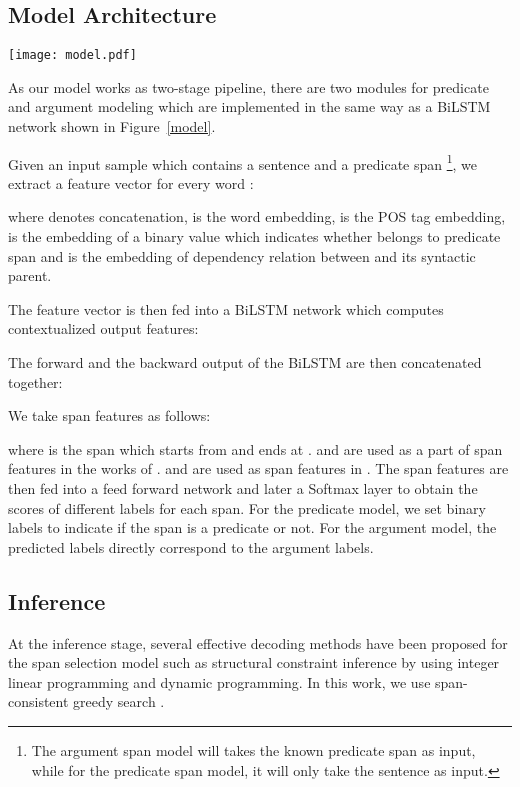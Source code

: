 \documentclass[letterpaper]{article} \usepackage{aaai20}  \usepackage{times}  \usepackage{helvet} \usepackage{courier}  \usepackage[hyphens]{url}  \urlstyle{rm} \def\UrlFont{\rm}  \usepackage{graphicx}  \frenchspacing  \setlength{\pdfpagewidth}{8.5in}  \setlength{\pdfpageheight}{11in}
\begin{document}
\subsection{Model Architecture}

\begin{figure*}[ht]
\begin{center}
\texttt{[image: model.pdf]}
\caption{An overview of the span model}
\label{model}
\end{center}
\end{figure*}

As our model works as two-stage pipeline, there are two modules for predicate and argument modeling which are implemented in the same way as a BiLSTM network shown in Figure~\ref{model}. 


Given an input sample which contains a sentence  and a predicate span \footnote{The argument span model will takes the known predicate span as input, while for the predicate span model, it will only take the sentence as input.}, we extract a feature vector  for every word :

where  denotes concatenation,  is the word embedding,  is the POS tag embedding,  is the embedding of a binary value which indicates whether  belongs to predicate span and  is the embedding of dependency relation between  and its syntactic parent.

The feature vector  is then fed into a BiLSTM network which computes contextualized output features:

The forward and the backward output of the BiLSTM are then concatenated together:

We take span features as follows:

where  is the span which starts from  and ends at .  and  are used as a part of span features in the works of \cite{He2018JointlyPP}.  and  are used as span features in \cite{Ouchi2018ASS}. The span features are then fed into a feed forward network and later a Softmax layer to obtain the scores of different labels for each span. For the predicate model, we set binary labels to indicate if the span is a predicate or not. For the argument model, the predicted labels directly correspond to the argument labels. 

\subsection{Inference}
 At the inference stage, several effective decoding methods have been proposed for the span selection model such as structural constraint inference by using integer linear programming  and dynamic programming. In this work, we use  span-consistent greedy search \cite{Ouchi2018ASS}. 
\end{document}
